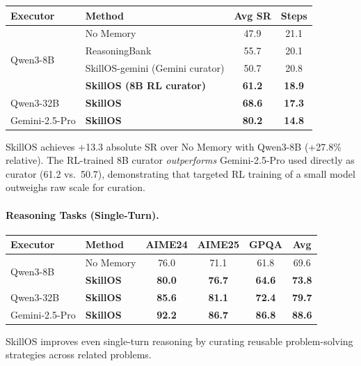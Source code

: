 \documentclass[11pt]{article}
\begin{document}
\begin{center}
\begin{tabular}{llcc}
\toprule
\textbf{Executor} & \textbf{Method} & \textbf{Avg SR} & \textbf{Steps} \\
\midrule
\multirow{4}{*}{Qwen3-8B} & No Memory & 47.9 & 21.1 \\
 & ReasoningBank & 55.7 & 20.1 \\
 & SkillOS-gemini (Gemini curator) & 50.7 & 20.8 \\
 & \textbf{SkillOS (8B RL curator)} & \textbf{61.2} & \textbf{18.9} \\
\midrule
Qwen3-32B & \textbf{SkillOS} & \textbf{68.6} & \textbf{17.3} \\
Gemini-2.5-Pro & \textbf{SkillOS} & \textbf{80.2} & \textbf{14.8} \\
\bottomrule
\end{tabular}
\end{center}

SkillOS achieves +13.3 absolute SR over No Memory with Qwen3-8B (+27.8\% relative). The RL-trained 8B curator \emph{outperforms} Gemini-2.5-Pro used directly as curator (61.2 vs.\ 50.7), demonstrating that targeted RL training of a small model outweighs raw scale for curation.

\paragraph{Reasoning Tasks (Single-Turn).}

\begin{center}
\begin{tabular}{llcccc}
\toprule
\textbf{Executor} & \textbf{Method} & \textbf{AIME24} & \textbf{AIME25} & \textbf{GPQA} & \textbf{Avg} \\
\midrule
\multirow{2}{*}{Qwen3-8B} & No Memory & 76.0 & 71.1 & 61.8 & 69.6 \\
 & \textbf{SkillOS} & \textbf{80.0} & \textbf{76.7} & \textbf{64.6} & \textbf{73.8} \\
\midrule
Qwen3-32B & \textbf{SkillOS} & \textbf{85.6} & \textbf{81.1} & \textbf{72.4} & \textbf{79.7} \\
Gemini-2.5-Pro & \textbf{SkillOS} & \textbf{92.2} & \textbf{86.7} & \textbf{86.8} & \textbf{88.6} \\
\bottomrule
\end{tabular}
\end{center}

SkillOS improves even single-turn reasoning by curating reusable problem-solving strategies across related problems.
\end{document}
